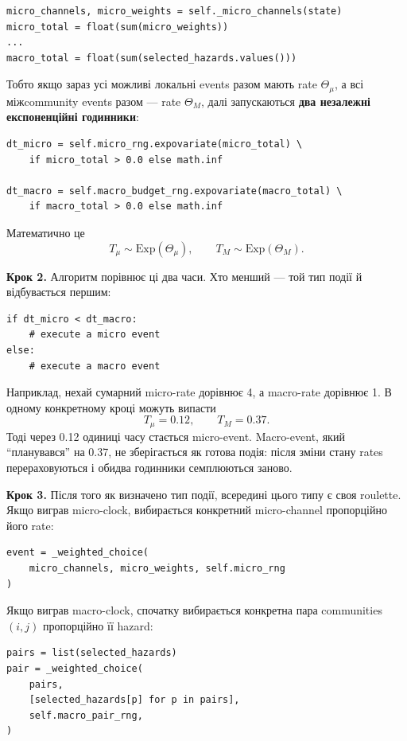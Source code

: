 \documentclass[11pt,a4paper]{article}
\begin{document}
\begin{lstlisting}[style=pycode]
micro_channels, micro_weights = self._micro_channels(state)
micro_total = float(sum(micro_weights))
...
macro_total = float(sum(selected_hazards.values()))
\end{lstlisting}

Тобто якщо зараз усі можливі локальні events разом мають rate
\(\Theta_{\mu}\), а всі міжcommunity events разом --- rate \(\Theta_M\), далі запускаються \textbf{два незалежні експоненційні годинники}:

\begin{lstlisting}[style=pycode]
dt_micro = self.micro_rng.expovariate(micro_total) \
    if micro_total > 0.0 else math.inf

dt_macro = self.macro_budget_rng.expovariate(macro_total) \
    if macro_total > 0.0 else math.inf
\end{lstlisting}

Математично це
\[
T_{\mu}\sim \mathrm{Exp}(\Theta_{\mu}),
\qquad
T_M\sim \mathrm{Exp}(\Theta_M).
\]

\textbf{Крок 2.} Алгоритм порівнює ці два часи. Хто менший --- той тип події й відбувається першим:

\begin{lstlisting}[style=pycode]
if dt_micro < dt_macro:
    # execute a micro event
else:
    # execute a macro event
\end{lstlisting}

Наприклад, нехай сумарний micro-rate дорівнює 4, а macro-rate дорівнює 1. В одному конкретному кроці можуть випасти
\[
T_{\mu}=0.12,\qquad T_M=0.37.
\]
Тоді через 0.12 одиниці часу стається micro-event. Macro-event, який ``планувався'' на 0.37, не зберігається як готова подія: після зміни стану rates перераховуються і обидва годинники семплюються заново.

\textbf{Крок 3.} Після того як визначено тип події, всередині цього типу є своя roulette.
Якщо виграв micro-clock, вибирається конкретний micro-channel пропорційно його rate:

\begin{lstlisting}[style=pycode]
event = _weighted_choice(
    micro_channels, micro_weights, self.micro_rng
)
\end{lstlisting}

Якщо виграв macro-clock, спочатку вибирається конкретна пара communities \((i,j)\) пропорційно її hazard:

\begin{lstlisting}[style=pycode]
pairs = list(selected_hazards)
pair = _weighted_choice(
    pairs,
    [selected_hazards[p] for p in pairs],
    self.macro_pair_rng,
)
\end{lstlisting}
\end{document}
